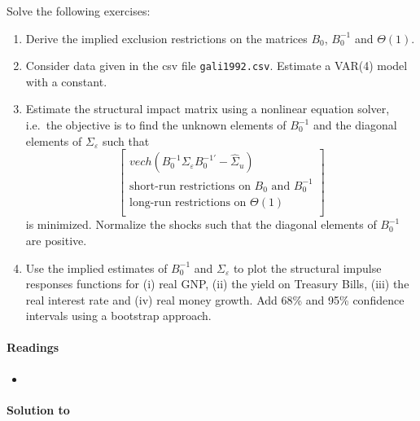 Solve the following exercises:
\begin{enumerate}
	\item Derive the implied exclusion restrictions on the matrices $B_0$, $B_0^{-1}$ and $\Theta(1)$.
	\item Consider data given in the csv file \texttt{gali1992.csv}.
	Estimate a VAR(4) model with a constant.
	\item Estimate the structural impact matrix using a nonlinear equation solver,
	  i.e.\ the objective is to find the unknown elements of $B_0^{-1}$ and the diagonal elements of $\Sigma_\varepsilon$ such that
	$$\begin{bmatrix}
	vech(B_0^{-1} \Sigma_\varepsilon B_0^{-1'}-\hat{\Sigma}_u)\\
	\text{short-run restrictions on }B_0 \text{ and } B_0^{-1} \\
	\text{long-run restrictions on }\Theta(1)\\
	\end{bmatrix}$$
	is minimized.
	Normalize the shocks such that the diagonal elements of $B_0^{-1}$ are positive.
	\item Use the implied estimates of $B_0^{-1}$ and $\Sigma_\varepsilon$ to plot the structural impulse responses functions
	for (i) real GNP, (ii) the yield on Treasury Bills, (iii) the real interest rate and (iv) real money growth.
    Add 68\% and 95\% confidence intervals using a bootstrap approach.
\end{enumerate}

\paragraph{Readings}
\begin{itemize}
	\item \textcite{Gali_1992_HowWellDoes}
\end{itemize}

\begin{solution}\textbf{Solution to }
\ifDisplaySolutions

\fi
\newpage
\end{solution}